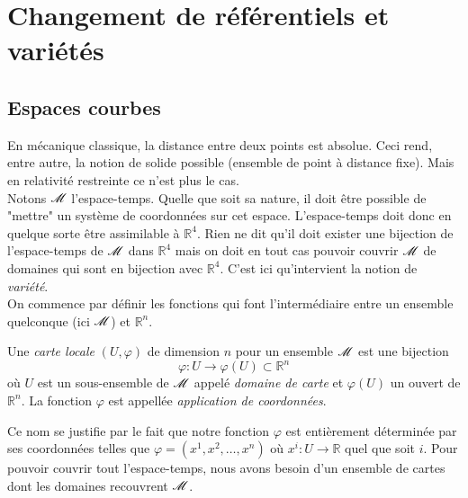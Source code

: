 \documentclass[a4paper,11pt]{report}
\begin{document}
    \section{Changement de référentiels et variétés}
    
        \subsection{Espaces courbes}
        
            En mécanique classique, la distance entre deux points est absolue. Ceci rend, entre autre, la notion de solide possible (ensemble de point à distance fixe). Mais en relativité restreinte ce n'est plus le cas. \\
            
            Notons $\mathscr{M}$ l'espace-temps. Quelle que soit sa nature, il doit être possible de "mettre" un système de coordonnées sur cet espace. L'espace-temps doit donc en quelque sorte être assimilable à $\mathbb{R}^4$. Rien ne dit qu'il doit exister une bijection de l'espace-temps de $\mathscr{M}$ dans $\mathbb{R}^4$ mais on doit en tout cas pouvoir couvrir $\mathscr{M}$ de domaines qui sont en bijection avec $\mathbb{R}^4$. C'est ici qu'intervient la notion de \textit{variété}.\\
            
            On commence par définir les fonctions qui font l'intermédiaire entre un ensemble quelconque (ici $\mathscr{M}$) et $\mathbb{R}^n$.
            \begin{defn}
                Une \textit{carte locale} $(U,\varphi)$ de dimension $n$ pour un ensemble $\mathscr{M}$ est une bijection
                \begin{equation}
                    \varphi:U\to\varphi(U) \subset\mathbb{R}^n
                \end{equation}
                où $U$ est un sous-ensemble de $\mathscr{M}$ appelé \textit{domaine de carte} et $\varphi(U)$ un ouvert de $\mathbb{R}^n$. La fonction $\varphi$ est appellée \textit{application de coordonnées}.
            \end{defn}
            
            Ce nom se justifie par le fait que notre fonction $\varphi$ est entièrement déterminée par ses coordonnées telles que $\varphi = (x^1, x^2, \ldots, x^n)$ où $x^i: U \to \mathbb{R}$ quel que soit $i$. Pour pouvoir couvrir tout l'espace-temps, nous avons besoin d'un ensemble de cartes dont les domaines recouvrent $\mathscr{M}$.
            
\end{document}
